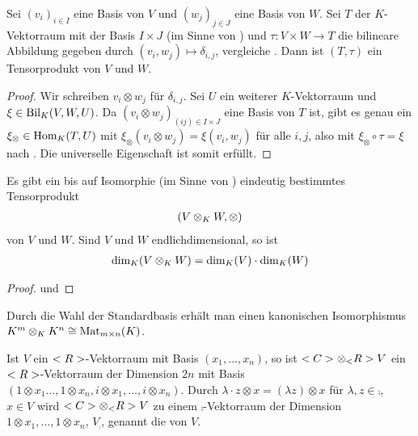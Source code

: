 \begin{lemma}
	Sei $(v_i)_{i\in I}$ eine Basis von $V$ und $(w_j)_{j\in J}$ eine Basis von $W$. Sei $T$ der $K$-Vektorraum mit der Basis $I\times J$ (im Sinne von ) und $\tau:V\times W\to T$ die bilineare Abbildung gegeben durch $(v_i,w_j)\mapsto \delta_{i,j}$, vergleiche . Dann ist $(T,\tau)$ ein Tensorprodukt von $V$ und $W$.
\end{lemma}
\begin{proof}
	Wir schreiben $v_i\otimes w_j$ für $\delta_{i,j}$. Sei $U$ ein weiterer $K$-Vektorraum und $\xi\in\operatorname{Bil}_K(V,W,U)$. Da $(v_i\otimes w_j)_{(ij)\in I\times J}$ eine Basis von $T$ ist, gibt es genau ein $\xi_\otimes\in\operatorname{Hom}_K(T,U)$ mit $\xi_\otimes(v_i\otimes w_j)=\xi(v_i,w_j)$ für alle $i,j$, also mit $\xi_\otimes\circ\tau=\xi$ nach . Die universelle Eigenschaft ist somit erfüllt.
\end{proof}

\begin{proposition}
	Es gibt ein bis auf Isomorphie (im Sinne von ) eindeutig bestimmtes Tensorprodukt
	\begin{align}
		(V\otimes_K W,\otimes)\notag
	\end{align}
	von $V$ und $W$. Sind $V$ und $W$ endlichdimensional, so ist
	\begin{align}
		\dim_K(V\otimes_K W)=\dim_K(V)\cdot\dim_K(W)\notag
	\end{align}
\end{proposition}
\begin{proof}
	 und 
\end{proof}

\begin{example}
	Durch die Wahl der Standardbasis erhält man einen kanonischen Isomorphismus $K^m\otimes_K K^n\cong\operatorname{Mat}_{m\times n}(K)$.
\end{example}

\begin{example}
	Ist $V$ ein $<R>$-Vektorraum mit Basis $(x_1,...,x_n)$, so ist $\comp\otimes_\real V$ ein $<R>$-Vektorraum der Dimension $2n$ mit Basis $(1\otimes x_1...,1\otimes x_n,i\otimes x_1,...,i\otimes x_n)$. Durch $\lambda\cdot z\otimes x=(\lambda z)\otimes x$ für $\lambda,z\in\comp$, $x\in V$ wird $\comp\otimes_\real V$ zu einem $\comp$-Vektorraum der Dimension $1\otimes x_1,...,1\otimes x_n$, $V_\comp$, genannt die  von $V$.
\end{example}

